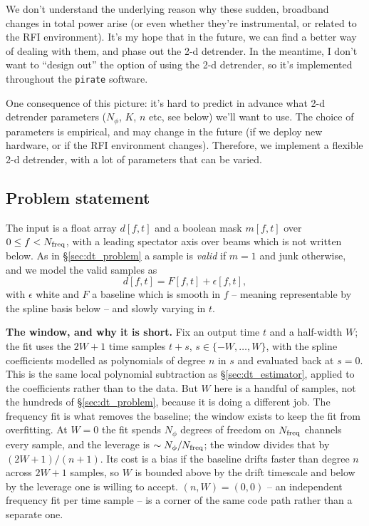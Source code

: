 \documentclass{article}
\numberwithin{equation}{section}   %
\begin{document}
We don't understand the underlying reason why these sudden, broadband changes in
total power arise (or even whether they're instrumental, or related to the RFI environment).
It's my hope that in the future, we can find a better way of dealing with them, and phase out
the 2-d detrender.
In the meantime, I don't want to ``design out'' the option of using the 2-d detrender, so it's
implemented throughout the {\tt pirate} software.

One consequence of this picture: it's hard to predict in advance what 2-d detrender
parameters ($N_\phi$, $K$, $n$ etc, see below) we'll want to use.
The choice of parameters is empirical, and may change in the future (if we deploy new hardware,
or if the RFI environment changes).
Therefore, we implement a flexible 2-d detrender, with a lot of parameters that can be varied.

\subsection{Problem statement}
\label{sec:sd_problem}

The input is a float array $d[f,t]$ and a boolean mask $m[f,t]$ over $0 \le f < N_{\rm freq}$, with a leading
spectator axis over beams which is not written below.  As in \S\ref{sec:dt_problem} a sample is {\em valid} if
$m=1$ and junk otherwise, and we model the valid samples as
\begin{equation}
d[f,t] = F[f,t] + \epsilon[f,t],
\end{equation}
with $\epsilon$ white and $F$ a baseline which is smooth in $f$ -- meaning representable by the spline basis
below -- and slowly varying in $t$.

{\bf The window, and why it is short.}  Fix an output time $t$ and a half-width $W$; the fit uses the $2W+1$
time samples $t+s$, $s \in \{-W,\ldots,W\}$, with the spline coefficients modelled as polynomials of degree $n$
in $s$ and evaluated back at $s = 0$.  This is the same local polynomial subtraction as
\S\ref{sec:dt_estimator}, applied to the coefficients rather than to the data.  But $W$ here is a handful of
samples, not the hundreds of \S\ref{sec:dt_problem}, because it is doing a different job.  The frequency fit is
what removes the baseline; the window exists to keep the fit from overfitting.  At $W=0$ the fit spends
$N_\phi$ degrees of freedom on $N_{\rm freq}$ channels every sample, and the leverage is $\sim N_\phi/N_{\rm
freq}$; the window divides that by $(2W+1)/(n+1)$.  Its cost is a bias if the baseline drifts faster than
degree $n$ across $2W+1$ samples, so $W$ is bounded above by the drift timescale and below by the leverage one
is willing to accept.  $(n,W) = (0,0)$ -- an independent frequency fit per time sample -- is a corner of the
same code path rather than a separate one.
\end{document}
